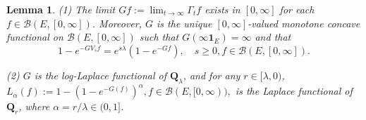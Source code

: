 \documentclass[12pt,a4paper]{amsart}
\numberwithin{equation}{section}
\theoremstyle{plain}
\newtheorem{lem}[thm]{Lemma}
\theoremstyle{definition}
\theoremstyle{remark}
\begin{document}
\begin{lem} \label{prop:G}
(1) The limit $Gf:= \lim_{t\to \infty} \Gamma_t f$ exists in $[0,\infty]$ for each $f\in \mathcal B(E,[0,\infty])$.
	Moreover, $G$ is the unique $[0,\infty]$-valued monotone concave functional on $\mathcal B(E,[0,\infty])$ such that
	$G(\infty  \mathbf 1_E) = \infty$ and that
\begin{equation} \label{eq:G.0}
	1 - e^{- GV_s f}
	= e^{s\lambda} (1 - e^{-Gf}),
	\quad s\geq 0, f\in \mathcal B(E,[0,\infty]).
\end{equation}

(2) $G$ is the log-Laplace functional of $\mathbf Q_\lambda$, and for any $r\in[\lambda, 0)$,
$L_\alpha(f):=1-\left(1-e^{-G(f)}\right)^\alpha, f\in\mathcal B(E,[0,\infty)),$
is the Laplace functional of $\mathbf Q_r$, where $\alpha=r/\lambda\in(0,1]$.
\end{lem}
\end{document}
